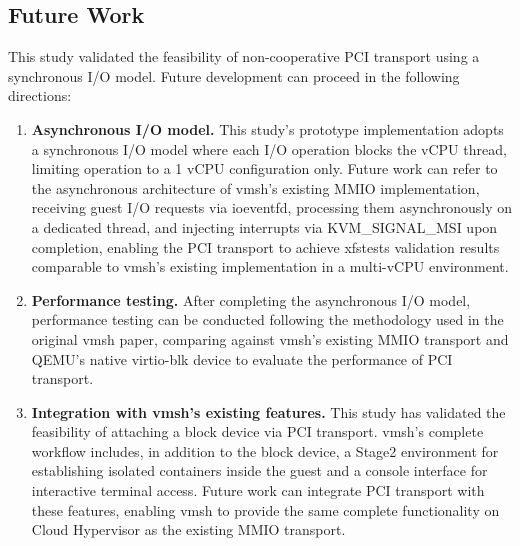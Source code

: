 \begin{ZhChapter}
\section{Future Work}
\label{sec:future-work}

This study validated the feasibility of non-cooperative PCI transport using a synchronous I/O model. Future development can proceed in the following directions:

\begin{enumerate}
    \item \begin{sloppypar}\textbf{Asynchronous I/O model.} This study's prototype implementation adopts a synchronous I/O model where each I/O operation blocks the vCPU thread, limiting operation to a 1 vCPU configuration only. Future work can refer to the asynchronous architecture of vmsh's existing MMIO implementation, receiving guest I/O requests via ioeventfd, processing them asynchronously on a dedicated thread, and injecting interrupts via KVM\_SIGNAL\_MSI upon completion, enabling the PCI transport to achieve xfstests validation results comparable to vmsh's existing implementation in a multi-vCPU environment.\end{sloppypar}

    \item \textbf{Performance testing.} After completing the asynchronous I/O model, performance testing can be conducted following the methodology used in the original vmsh paper, comparing against vmsh's existing MMIO transport and QEMU's native virtio-blk device to evaluate the performance of PCI transport.

    \item \textbf{Integration with vmsh's existing features.} This study has validated the feasibility of attaching a block device via PCI transport. vmsh's complete workflow includes, in addition to the block device, a Stage2 environment for establishing isolated containers inside the guest and a console interface for interactive terminal access. Future work can integrate PCI transport with these features, enabling vmsh to provide the same complete functionality on Cloud Hypervisor as the existing MMIO transport.
\end{enumerate}

\end{ZhChapter}
